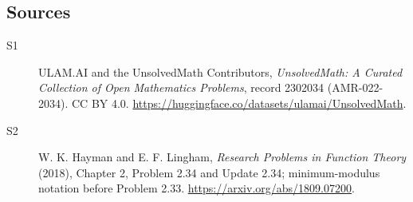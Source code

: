 \documentclass[11pt]{article}
\begin{document}
\subsection{Sources}
\begin{description}
\item[\hypertarget{source:2302034:1}{S1}] ULAM.AI and the UnsolvedMath Contributors, \emph{UnsolvedMath: A Curated Collection of Open Mathematics Problems}, record 2302034 (AMR-022-2034). CC BY 4.0. \url{https://huggingface.co/datasets/ulamai/UnsolvedMath}.
\item[\hypertarget{source:2302034:2}{S2}] W. K. Hayman and E. F. Lingham, \emph{Research Problems in Function Theory} (2018), Chapter 2, Problem 2.34 and Update 2.34; minimum-modulus notation before Problem 2.33. \url{https://arxiv.org/abs/1809.07200}.
\end{description}
\label{end:2302034}
\end{document}
